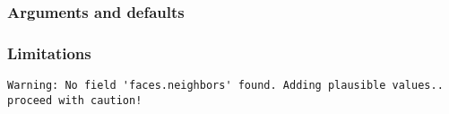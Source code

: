 \subsubsection{Arguments and defaults}

\subsubsection{Limitations}

\begin{verbatim}
Warning: No field 'faces.neighbors' found. Adding plausible values..
proceed with caution! 
\end{verbatim}
